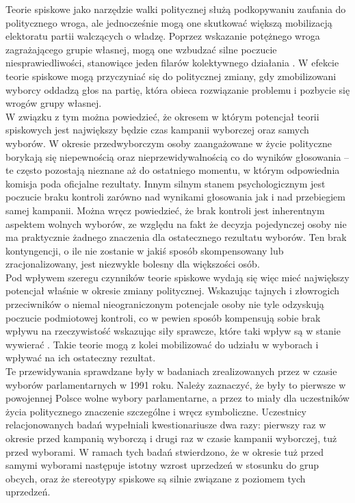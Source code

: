 \documentclass[man]{apa6}
\begin{document}
    Teorie spiskowe jako narzędzie walki politycznej służą podkopywaniu zaufania do politycznego wroga, ale jednocześnie mogą one skutkować większą mobilizacją elektoratu partii walczących o władzę. Poprzez wskazanie potężnego wroga zagrażającego grupie własnej, mogą one wzbudzać silne poczucie niesprawiedliwości, stanowiące jeden filarów kolektywnego działania \parencite{van2008toward}. W efekcie teorie spiskowe mogą przyczyniać się do politycznej zmiany, gdy zmobilizowani wyborcy oddadzą głos na partię, która obieca rozwiązanie problemu i pozbycie się wrogów grupy własnej.\\
    W związku z tym można powiedzieć, że okresem w którym potencjał teorii spiskowych jest największy będzie czas kampanii wyborczej oraz samych wyborów. W okresie przedwyborczym osoby zaangażowane w życie polityczne borykają się niepewnością oraz nieprzewidywalnością co do wyników głosowania -- te często pozostają nieznane aż do ostatniego momentu, w którym odpowiednia komisja poda oficjalne rezultaty. Innym silnym stanem psychologicznym jest poczucie braku kontroli zarówno nad wynikami głosowania jak i nad przebiegiem samej kampanii. Można wręcz powiedzieć, że brak kontroli jest inherentnym aspektem wolnych wyborów, ze względu na fakt że decyzja pojedynczej osoby nie ma praktycznie żadnego znaczenia dla ostatecznego rezultatu wyborów. Ten brak kontyngencji, o ile nie zostanie w jakiś sposób skompensowany lub zracjonalizowany, jest niezwykle bolesny dla większości osób.\\
    Pod wpływem szeregu czynników teorie spiskowe wydają się więc mieć największy potencjał właśnie w okresie zmiany politycznej. Wskazując tajnych i złowrogich przeciwników o niemal nieograniczonym potencjale osoby nie tyle odzyskują poczucie podmiotowej kontroli, co w pewien sposób kompensują sobie brak wpływu na rzeczywistość wskazując siły sprawcze, które taki wpływ są w stanie wywierać \parencite[][]{kay2008god}. Takie teorie mogą z kolei mobilizować do udziału w wyborach i wpływać na ich ostateczny rezultat.\\
    Te przewidywania sprawdzane były w badaniach zrealizowanych przez \textcite{kofta1992struktura} w czasie wyborów parlamentarnych w 1991 roku. Należy zaznaczyć, że były to pierwsze w powojennej Polsce wolne wybory parlamentarne, a przez to miały dla uczestników życia politycznego znaczenie szczególne i wręcz symboliczne. Uczestnicy relacjonowanych badań wypełniali kwestionariusze dwa razy: pierwszy raz w okresie przed kampanią wyborczą i drugi raz w czasie kampanii wyborczej, tuż przed wyborami. W ramach tych badań stwierdzono, że w okresie tuż przed samymi wyborami następuje istotny wzrost uprzedzeń w stosunku do grup obcych, oraz że stereotypy spiskowe są silnie związane z poziomem tych uprzedzeń.\\
    
\end{document}
